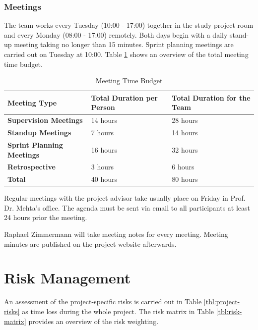 \subsection{Meetings}

The team works every Tuesday (10:00 - 17:00) together in the study project room and every Monday (08:00 - 17:00) remotely. Both days begin with a daily stand-up meeting taking no longer than 15 minutes. Sprint planning meetings are carried out on Tuesday at 10:00. Table \ref{meeting-time-budget} shows an overview of the total meeting time budget.

\begin{table}[]
	\centering
	\caption{Meeting Time Budget}
	\label{meeting-time-budget}
	\begin{tabular}{lll}
		\hline
		\textbf{Meeting Type}             & \textbf{Total Duration per Person} & \textbf{Total Duration for the Team} \\ \hline
		\textbf{Supervision Meetings}     & 14 hours                           & 28 hours                             \\
		\textbf{Standup Meetings}         & 7 hours                            & 14 hours                             \\
		\textbf{Sprint Planning Meetings} & 16 hours                           & 32 hours                             \\
		\textbf{Retrospective}            & 3 hours                            & 6 hours                              \\ \hline
		\textbf{Total}                    & 40 hours                           & 80 hours                            
	\end{tabular}
\end{table}

Regular meetings with the project advisor take usually place on Friday in Prof. Dr. Mehta's office. The agenda must be sent via email to all participants at least 24 hours prior the meeting.

Raphael Zimmermann will take meeting notes for every meeting. Meeting minutes are published on the project website afterwards.

\chapter{Risk Management}

An assessment of the project-specific risks is carried out in Table \ref{tbl:project-risks} as time loss during the whole project. The risk matrix in Table \ref{tbl:risk-matrix} provides an overview of the risk weighting.

